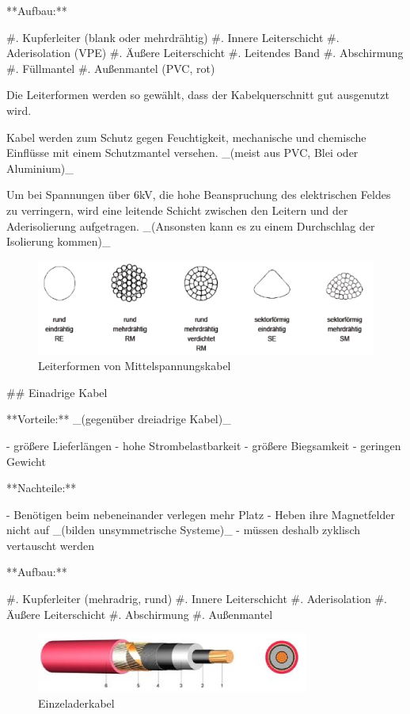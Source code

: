 \begin{markdown}
**Aufbau:**

#. Kupferleiter (blank oder mehrdrähtig)
#. Innere Leiterschicht
#. Aderisolation (VPE)
#. Äußere Leiterschicht
#. Leitendes Band
#. Abschirmung
#. Füllmantel
#. Außenmantel (PVC, rot)

Die Leiterformen werden so gewählt, dass der Kabelquerschnitt gut ausgenutzt wird. 

Kabel werden zum Schutz gegen Feuchtigkeit, mechanische und chemische Einflüsse mit einem Schutzmantel versehen. _(meist aus PVC, Blei oder Aluminium)_

Um bei Spannungen über 6kV, die hohe Beanspruchung des elektrischen Feldes zu verringern, wird eine leitende Schicht zwischen den Leitern und der Aderisolierung aufgetragen. _(Ansonsten kann es zu einem Durchschlag der Isolierung kommen)_

\begin{figure}[H]
    \includegraphics[width=\linewidth]{./images/09-Kabel/Mittelspannungskabel-Leiterformen.png}
    \caption[Leiterformen von Mittelspannungskabel]{Leiterformen von Mittelspannungskabel}
\end{figure}

\newpage

## Einadrige Kabel

**Vorteile:** _(gegenüber dreiadrige Kabel)_

- größere Lieferlängen
- hohe Strombelastbarkeit
- größere Biegsamkeit
- geringen Gewicht 

**Nachteile:**

- Benötigen beim nebeneinander verlegen mehr Platz 
- Heben ihre Magnetfelder nicht auf _(bilden unsymmetrische Systeme)_
    - müssen deshalb zyklisch vertauscht werden 

**Aufbau:**

#. Kupferleiter (mehradrig, rund)
#. Innere Leiterschicht
#. Aderisolation
#. Äußere Leiterschicht
#. Abschirmung
#. Außenmantel

\begin{figure}[H]
    \centering
    \includegraphics[width=0.8\textwidth]{./images/09-Kabel/Einzeladerkabel.png}
    \caption[Einzeladerkabel]{Einzeladerkabel}
\end{figure}


\end{markdown}
